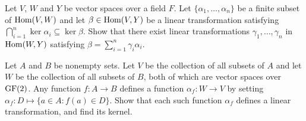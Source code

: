 \probskip

\begin{problem}[Golan 306]
Let $V$, $W$ and $Y$ be vector spaces over a field $F$.  Let 
$\{\alpha_1, \dots, \alpha_n\}$ be a finite subset of $\operatorname{Hom}(V, W)$
and let $\beta \in \operatorname{Hom}(V,Y)$ be a linear transformation satisfying
$\bigcap_{i=1}^n \ker{\alpha_i} \subseteq \ker{\beta}$.  Show that there exist
linear transformations $\gamma_1, \dots, \gamma_n$ in $\operatorname{Hom}(W,Y)$ satisfying
$\beta = \sum_{i=1}^n \gamma_i \alpha_i$.
\end{problem}

\probskip

\begin{problem}[Golan 266]
Let $A$ and $B$ be nonempty sets.  Let $V$ be the collection of all subsets of
$A$ and let $W$ be the collection of all subsets of $B$, both of which are
vector spaces over $\operatorname{GF}(2)$.  Any function $f: A\rightarrow B$ defines a
function $\alpha_f : W \rightarrow V$ by setting 
$\alpha_f: D \mapsto \{a \in A : f(a) \in D\}$.  Show that each such function
$\alpha_f$ defines a linear transformation, and find its kernel.
\end{problem}


%
%


